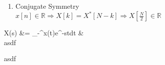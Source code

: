 \documentclass[a4paper, 11pt]{article}
\begin{document}
	\dotfill
	\begin{enumerate}
		\item Conjugate Symmetry\\
			$x[n] \in \mathbb{R} \Longrightarrow X[k] = X^*[N-k] \Longrightarrow X[\frac{N}{2}] \in \mathbb{R}$
	\end{enumerate}
	\hrulefill
	\begin{multicols}{2}
		\noindent {}
		\begin{flalign*}
			X(s) &= \int_{-\infty}^{\infty}x(t)e^{-st}dt &\\
			asdf
		\end{flalign*}
		\columnbreak
		asdf
	\end{multicols}
\end{document}
